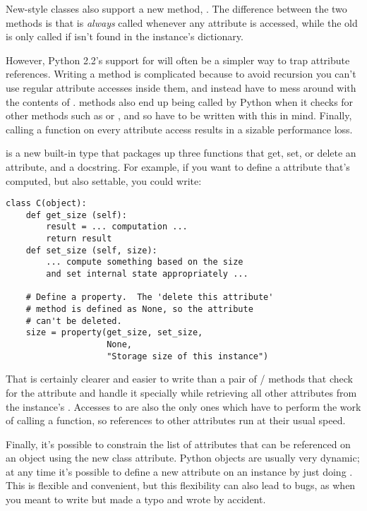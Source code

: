 \documentclass{howto}
\begin{document}
New-style classes also support a new method,
.  The difference between
the two methods is that  is \emph{always}
called whenever any attribute is accessed, while the old
 is only called if  isn't found in the
instance's dictionary.

However, Python 2.2's support for  will often be a
simpler way to trap attribute references.  Writing a
 method is complicated because to avoid recursion
you can't use regular attribute accesses inside them, and instead have
to mess around with the contents of .
 methods also end up being called by Python when
it checks for other methods such as  or
, and so have to be written with this in mind.
Finally, calling a function on every attribute access results in a
sizable performance loss.

 is a new built-in type that packages up three
functions that get, set, or delete an attribute, and a docstring.  For
example, if you want to define a  attribute that's
computed, but also settable, you could write:

\begin{verbatim}
class C(object):
    def get_size (self):
        result = ... computation ...
        return result
    def set_size (self, size):
        ... compute something based on the size
        and set internal state appropriately ...

    # Define a property.  The 'delete this attribute'
    # method is defined as None, so the attribute
    # can't be deleted.
    size = property(get_size, set_size,
                    None,
                    "Storage size of this instance")
\end{verbatim}

That is certainly clearer and easier to write than a pair of
/ methods that check for the
 attribute and handle it specially while retrieving all
other attributes from the instance's .  Accesses to
 are also the only ones which have to perform the work of
calling a function, so references to other attributes run at
their usual speed.

Finally, it's possible to constrain the list of attributes that can be
referenced on an object using the new  class attribute.
Python objects are usually very dynamic; at any time it's possible to
define a new attribute on an instance by just doing
.  This is flexible and convenient, but this
flexibility can also lead to bugs, as when you meant to write
 but made a typo and wrote
 by accident.  
\end{document}
